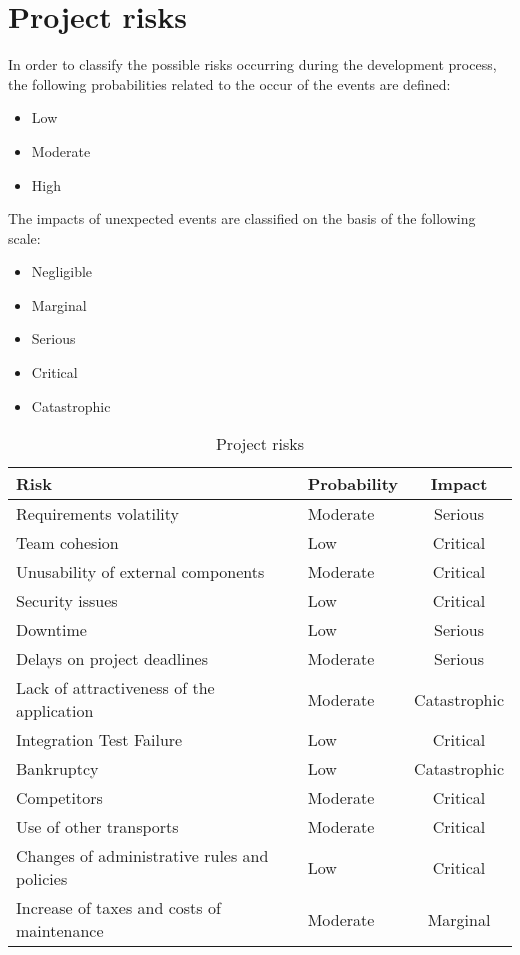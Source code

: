 \chapter{Project risks}
In order to classify the possible risks occurring during the development process, the following probabilities related to the occur of the events are defined:
\begin{itemize}
\item Low
\item Moderate
\item High
\end{itemize}

The impacts of unexpected events are classified on the basis of the following scale:
\begin{itemize}
\item Negligible
\item Marginal
\item Serious
\item Critical
\item Catastrophic
\end{itemize}

\clearpage
\begin{table}[!h]
\centering
\caption{Project risks}
\label{project-risks}
\begin{tabularx}{\linewidth}{XXc}
\hline
\textbf{Risk}                & \textbf{Probability} & \textbf{Impact} \\ \hline
Requirements volatility      & Moderate             & Serious \\
Team cohesion                & Low                  & Critical \\
Unusability of external components & Moderate       & Critical \\
Security issues              & Low                  & Critical \\
Downtime                     & Low                  & Serious \\
Delays on project deadlines  & Moderate             & Serious \\
Lack of attractiveness of  the application & Moderate & Catastrophic \\
Integration Test Failure     & Low                  & Critical \\
Bankruptcy                   & Low                  & Catastrophic \\
Competitors                  & Moderate             & Critical \\
Use of other transports      & Moderate             & Critical \\
Changes of administrative rules and policies & Low  & Critical \\
Increase of taxes and costs of maintenance & Moderate & Marginal \\
\end{tabularx}
\end{table}

